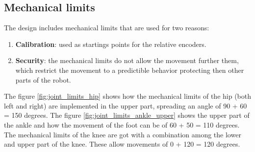 \subsection{Mechanical limits} %
\label{sub:mechanical_limits}
The design includes mechanical limits that are used for two reasons:
\begin{enumerate}
  \item \textbf{Calibration}: used as startings points for the relative encoders.
  \item \textbf{Security}: the mechanical limits do not allow the movement further them, which restrict the movement to a predictible behavior protecting then other parts of the robot.
\end{enumerate}

The figure \ref{fig:joint_limits_hip} shows how the mechanical limits of the hip (both left and right) are implemented in the upper part, spreading an angle of 90 + 60 = 150 degrees.
The figure \ref{fig:joint_limits_ankle_upper} shows the upper part of the ankle and how the movement of the foot can be of 60 + 50 = 110 degrees.
The mechanical limits of the knee are got with a combination among the lower and upper part of the knee.
These allow movements of 0 + 120 = 120 degrees.

